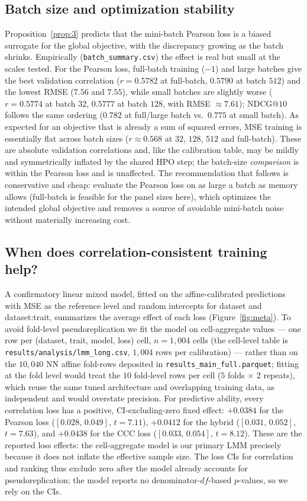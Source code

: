 \subsection{Batch size and optimization stability}\label{sec:res-batch}
Proposition~\ref{prop:3} predicts that the mini-batch Pearson loss is a biased
surrogate for the global objective, with the discrepancy growing as the batch
shrinks. Empirically (\texttt{batch\_summary.csv}) the effect is real but small at
the scales tested. For the Pearson loss, full-batch training ($-1$) and large
batches give the best validation correlation ($r=0.5782$ at full-batch, $0.5790$
at batch $512$) and the lowest RMSE ($7.56$ and $7.55$), while small batches are
slightly worse ($r=0.5774$ at batch $32$, $0.5777$ at batch $128$, with RMSE
$\approx\!7.61$); NDCG@$10$ follows the same ordering ($0.782$ at full/large
batch vs.\ $0.775$ at small batch). As expected for an objective that is already a
sum of squared errors, MSE training is essentially flat across batch sizes
($r\approx0.568$ at $32$, $128$, $512$ and full-batch). These are absolute
validation correlations and, like the calibration table, may be mildly and
symmetrically inflated by the shared HPO step; the batch-size \emph{comparison} is
within the Pearson loss and is unaffected. The recommendation that follows is
conservative and cheap: evaluate the Pearson loss on as large a batch as memory
allows (full-batch is feasible for the panel sizes here), which optimizes the
intended global objective and removes a source of avoidable mini-batch noise
without materially increasing cost.

\subsection{When does correlation-consistent training help?}\label{sec:res-meta}
A confirmatory linear mixed model, fitted on the affine-calibrated predictions
with MSE as the reference level and random intercepts for dataset and
dataset:trait, summarizes the average effect of each loss
(Figure~\ref{fig:meta}). To avoid fold-level pseudoreplication we fit the model on
cell-aggregate values --- one row per (dataset, trait, model, loss) cell, $n=1{,}004$
cells (the cell-level table is \texttt{results/analysis/lmm\_long.csv}, $1{,}004$
rows per calibration) --- rather than on the $10{,}040$ NN affine fold-rows
deposited in \texttt{results\_main\_full.parquet}; fitting at the fold level would
treat the $10$ fold-level rows per cell ($5$ folds $\times$ $2$ repeats), which
reuse the same tuned architecture and overlapping training data, as independent and
would overstate precision. For predictive ability, every correlation loss has a
positive, CI-excluding-zero fixed effect: $+0.0384$ for the Pearson loss
($[0.028,\,0.049]$, $t=7.11$), $+0.0412$ for the hybrid ($[0.031,\,0.052]$,
$t=7.63$), and $+0.0438$ for the CCC loss ($[0.033,\,0.054]$, $t=8.12$). These are
the reported loss effects: the cell-aggregate model is our primary LMM precisely
because it does not inflate the effective sample size. The loss CIs for correlation
and ranking thus exclude zero after the model already accounts for
pseudoreplication; the model reports no denominator-$df$-based $p$-values, so we
rely on the CIs.

